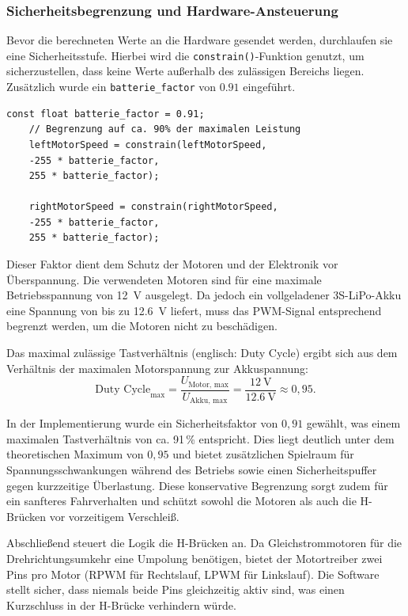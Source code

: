\subsubsection{Sicherheitsbegrenzung und Hardware-Ansteuerung}
Bevor die berechneten Werte an die Hardware gesendet werden, durchlaufen sie eine Sicherheitsstufe. Hierbei wird die \texttt{constrain()}-Funktion genutzt, um sicherzustellen, dass keine Werte außerhalb des zulässigen Bereichs liegen. Zusätzlich wurde ein \texttt{batterie\_factor} von $0.91$ eingeführt.

\begin{lstlisting}[style=motorStyle, caption={Begrenzung der Ausgangsspannung}]
	const float batterie_factor = 0.91; 
	// Begrenzung auf ca. 90% der maximalen Leistung
	leftMotorSpeed = constrain(leftMotorSpeed, 
	-255 * batterie_factor, 
	255 * batterie_factor);
	
	rightMotorSpeed = constrain(rightMotorSpeed, 
	-255 * batterie_factor, 
	255 * batterie_factor);
\end{lstlisting}

Dieser Faktor dient dem Schutz der Motoren und der Elektronik vor Überspannung. Die verwendeten Motoren sind für eine maximale Betriebsspannung von \SI{12}{\volt} ausgelegt. Da jedoch ein vollgeladener 3S-LiPo-Akku eine Spannung von bis zu \SI{12,6}{\volt} liefert, muss das PWM-Signal entsprechend begrenzt werden, um die Motoren nicht zu beschädigen.

Das maximal zulässige Tastverhältnis (englisch: Duty Cycle) ergibt sich aus dem Verhältnis der maximalen Motorspannung zur Akkuspannung: 
\[
\text{Duty Cycle}_{\text{max}} = \frac{U_{\text{Motor, max}}}{U_{\text{Akku, max}}} = \frac{\SI{12}{\volt}}{\SI{12,6}{\volt}} \approx 0{,}95 .
\]

In der Implementierung wurde ein Sicherheitsfaktor von $0{,}91$ gewählt, was einem maximalen Tastverhältnis von ca. 91\,\% entspricht. Dies liegt deutlich unter dem theoretischen Maximum von $0{,}95$ und bietet zusätzlichen Spielraum für Spannungsschwankungen während des Betriebs sowie einen Sicherheitspuffer gegen kurzzeitige Überlastung. Diese konservative Begrenzung sorgt zudem für ein sanfteres Fahrverhalten und schützt sowohl die Motoren als auch die H-Brücken vor vorzeitigem Verschleiß.



Abschließend steuert die Logik die H-Brücken an. Da Gleichstrommotoren für die Drehrichtungsumkehr eine Umpolung benötigen, bietet der Motortreiber zwei Pins pro Motor (RPWM für Rechtslauf, LPWM für Linkslauf). Die Software stellt sicher, dass niemals beide Pins gleichzeitig aktiv sind, was einen Kurzschluss in der H-Brücke verhindern würde.

